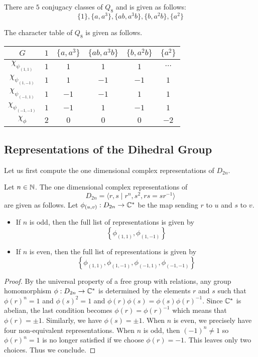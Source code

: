 \documentclass[a4paper]{article}
\begin{document}
\begin{prp}{}{} There are $5$ conjugacy classes of $Q_8$ and is given as follows: $$\{1\},\{a,a^3\},\{ab,a^3b\},\{b,a^2b\},\{a^2\}$$
\end{prp}

\begin{thm}{}{} The character table of $Q_8$ is given as follows. 
\begin{center}
\begin{tabular}{ c|ccccc } 
$G$ & $1$ & $\{a,a^3\}$ & $\{ab,a^3b\}$ & $\{b,a^2b\}$ & $\{a^2\}$ \\\hline
$\chi_{\psi_{(1,1)}}$ & $1$ & $1$ & $1$ & $1$ & $\cdots$ \\
$\chi_{\psi_{(1,-1)}}$ & $1$ & $1$ & $-1$ & $-1$ & $1$ \\
$\chi_{\psi_{(-1,1)}}$ & $1$ & $-1$ & $-1$ & $1$ & $1$ \\
$\chi_{\psi_{(-1,-1)}}$ & $1$ & $-1$ & $1$ & $-1$ & $1$ \\
$\chi_{\phi}$ & $2$ & $0$ & $0$ & $0$ & $-2$ \\
\end{tabular}
\end{center}
\end{thm}

\subsection{Representations of the Dihedral Group}
Let us first compute the one dimensional complex representations of $D_{2n}$. 

\begin{thm}{}{} Let $n\in\mathbb{N}$. The one dimensional complex representations of $$D_{2n}=\langle r,s\;|\;r^n,s^2,rs=sr^{-1}\rangle$$ are given as follows. Let $\phi_{(u,v)}:D_{2n}\to\mathbb{C}^\ast$ be the map sending $r$ to $u$ and $s$ to $v$.
\begin{itemize}
\item If $n$ is odd, then the full list of representations is given by $$\left\{\phi_{(1,1)},\phi_{(1,-1)}\right\}$$
\item If $n$ is even, then the full list of representations is given by $$\left\{\phi_{(1,1)},\phi_{(1,-1)},\phi_{(-1,1)},\phi_{(-1,-1)}\right\}$$
\end{itemize} \tcbline
\begin{proof}
By the universal property of a free group with relations, any group homomorphism $\phi:D_{2n}\to\mathbb{C}^\ast$ is determined by the elements $r$ and $s$ such that $\phi(r)^n=1$ and $\phi(s)^2=1$ and $\phi(r)\phi(s)=\phi(s)\phi(r)^{-1}$. Since $\mathbb{C}^\ast$ is abelian, the last condition becomes $\phi(r)=\phi(r)^{-1}$ which means that $\phi(r)=\pm1$. Similarly, we have $\phi(s)=\pm1$. When $n$ is even, we precisely have four non-equivalent representations. When $n$ is odd, then $(-1)^n\neq 1$ so $\phi(r)^n=1$ is no longer satisfied if we choose $\phi(r)=-1$. This leaves only two choices. Thus we conclude. 
\end{proof}
\end{thm}
\end{document}
